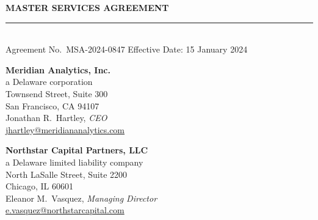 \documentclass[11pt,a4paper]{article}
\begin{document}
\begin{center}
  {\LARGE\bfseries\color{accent}MASTER SERVICES AGREEMENT}\\[0.4em]
  {\color{accent!30}\rule{0.55\textwidth}{0.5pt}}\\[0.6em]
  {\footnotesize\color{medium}Agreement No.\ MSA-2024-0847 \quad\textbar\quad Effective Date: 15 January 2024}
\end{center}
\vspace{1em}


\vspace{0.6em}
\noindent
\begin{minipage}[t]{0.48\textwidth}
  \textbf{Meridian Analytics, Inc.}\\[2pt]
  {\footnotesize\color{medium}a Delaware corporation}\\[4pt]
   Townsend Street, Suite 300\\
  \hspace*{1.4em}San Francisco, CA 94107\\[3pt]
  \quad Jonathan R.\ Hartley, \textit{CEO}\\[2pt]
  \quad \href{mailto:jhartley@meridiananalytics.com}{jhartley@meridiananalytics.com}
\end{minipage}
\hfill
\begin{minipage}[t]{0.48\textwidth}
  \textbf{Northstar Capital Partners, LLC}\\[2pt]
  {\footnotesize\color{medium}a Delaware limited liability company}\\[4pt]
   North LaSalle Street, Suite 2200\\
  \hspace*{1.4em}Chicago, IL 60601\\[3pt]
  \quad Eleanor M.\ Vasquez, \textit{Managing Director}\\[2pt]
  \quad \href{mailto:e.vasquez@northstarcapital.com}{e.vasquez@northstarcapital.com}
\end{minipage}

\vspace{0.6em}
\noindent{\color{accent!25}\rule{\textwidth}{0.4pt}}

\smallskip
{}
\end{document}
